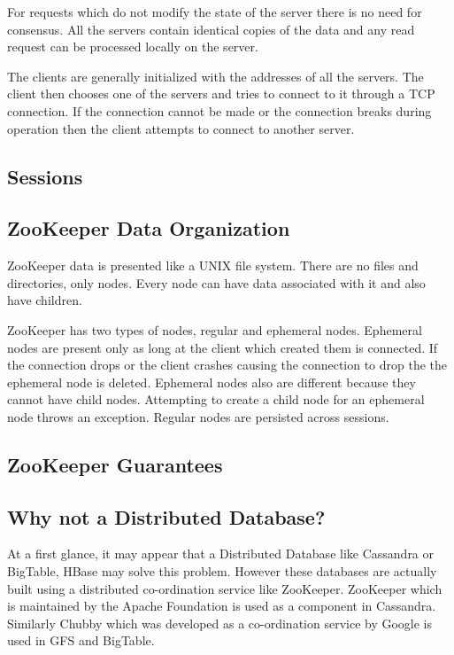 For requests which do not modify the state of the server there is no need for consensus. All the servers contain identical copies of the data and any read request can be processed locally on the server. 

The clients are generally initialized with the addresses of all the servers. The client then chooses one of the servers and tries to connect to it through a TCP connection. If the connection cannot be made or the connection breaks during operation then the client attempts to connect to another server.


\subsection{Sessions}

\subsection{ZooKeeper Data Organization}
ZooKeeper data is presented like a UNIX file system. There are no files and directories, only nodes. Every node can have data associated with it and also have children. 



ZooKeeper has two types of nodes, regular and ephemeral nodes. Ephemeral nodes are present only as long at the client which created them is connected. If the connection drops or the client crashes causing the connection to drop the the ephemeral node is deleted. Ephemeral nodes also are different because they cannot have child nodes. Attempting to create a child node for an ephemeral node throws an exception. Regular nodes are persisted across sessions.

\subsection{ZooKeeper Guarantees}

\subsection{Why not a Distributed Database?}
At a first glance, it may appear that a Distributed Database like Cassandra or BigTable, HBase may solve this problem. However these databases are actually built using a distributed co-ordination service like ZooKeeper. ZooKeeper which is maintained by the Apache Foundation is used as a component in Cassandra. Similarly Chubby which was developed as a co-ordination service by Google is used in GFS and BigTable.

